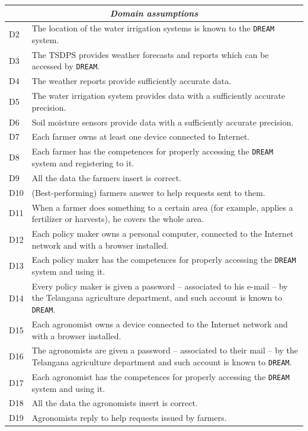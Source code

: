 \documentclass{article}
\begin{document}
\begin{longtable}[c]{|m{0.75cm}|m{11cm}|}
 \hline
 \multicolumn{2}{|c|}{\cellcolor{white}\textbf{\emph{Domain assumptions}}}
 \endfirsthead
 \endhead
 \endfoot
 \endlastfoot
  \hline
  D1 & The location of the sensors is known to the \verb|DREAM| system.\\
  \hline
   D2 & The location of the water irrigation systems is known to the \verb|DREAM| system.\\
  \hline
  D3 & The TSDPS provides weather forecasts and reports which can be accessed by \verb|DREAM|.\\
  \hline
  D4 & The weather reports provide sufficiently accurate data.\\
  \hline
  D5 & The water irrigation system provides data with a sufficiently accurate precision.\\
  \hline
  D6 & Soil moisture sensors provide data with a sufficiently accurate precision.\\
  \hline
  D7 & Each farmer owns at least one device connected to Internet.\\
  \hline
  D8 & Each farmer has the competences for properly accessing the \verb|DREAM| system and registering to it.\\
  \hline
  D9 & All the data the farmers insert is correct.\\
  \hline
  D10 & (Best-performing) farmers answer to help requests sent to them.\\
  \hline
  D11 & When a farmer does something to a certain area (for example, applies a fertilizer or harvests), he covers the whole area.\\
  \hline
  D12 & Each policy maker owns a personal computer, connected to the Internet network and with a browser installed.\\
 \hline
  D13 & Each policy maker has the competences for properly accessing the \verb|DREAM| system and using it.\\
  \hline
  D14 & Every policy maker is given a password – associated to his e-mail – by the Telangana agriculture department, and such account is known to \verb|DREAM|.\\
  \hline
  D15 & Each agronomist owns a device connected to the Internet network and with a browser installed.\\
  \hline
  D16 & The agronomists are given a password – associated to their mail – by the Telangana agriculture department and such account is known to \verb|DREAM|.\\
  \hline
  D17 & Each agronomist has the competences for properly accessing the \verb|DREAM| system and using it.\\
  
   \hline
  D18 & All the data the agronomists insert is correct.\\
  \hline
  D19 & Agronomists reply to help requests issued by farmers.\\
  \hline
  \end{longtable}
\end{document}
